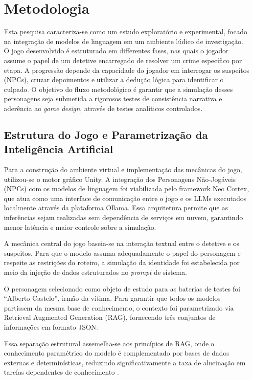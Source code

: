 \documentclass[12pt]{article}
\begin{document}
\section{Metodologia}

Esta pesquisa caracteriza-se como um estudo exploratório e experimental, focado na integração de modelos de linguagem em um ambiente lúdico de investigação. O jogo desenvolvido é estruturado em differentes fases, nas quais o jogador assume o papel de um detetive encarregado de resolver um crime específico por etapa. A progressão depende da capacidade do jogador em interrogar os suspeitos (NPCs), cruzar depoimentos e utilizar a dedução lógica para identificar o culpado. O objetivo do fluxo metodológico é garantir que a simulação desses personagens seja submetida a rigorosos testes de consistência narrativa e aderência ao \textit{game design}, através de testes analíticos controlados.

\subsection{Estrutura do Jogo e Parametrização da Inteligência Artificial}

Para a construção do ambiente virtual e implementação das mecânicas do jogo, utilizou-se o motor gráfico Unity. A integração dos Personagens Não-Jogáveis (NPCs) com os modelos de linguagem foi viabilizada pelo framework Neo Cortex, que atua como uma interface de comunicação entre o jogo e os LLMs executados localmente através da plataforma Ollama. Essa arquitetura permite que as inferências sejam realizadas sem dependência de serviços em nuvem, garantindo menor latência e maior controle sobre a simulação.

A mecânica central do jogo baseia-se na interação textual entre o detetive e os suspeitos. Para que o modelo assuma adequadamente o papel do personagem e respeite as restrições do roteiro, a simulação da identidade foi estabelecida por meio da injeção de dados estruturados no \textit{prompt} de sistema. 

O personagem selecionado como objeto de estudo para as baterias de testes foi ``Alberto Castelo'', irmão da vítima. Para garantir que todos os modelos partissem da mesma base de conhecimento, o contexto foi parametrizado via Retrieval Augmented Generation (RAG), fornecendo três conjuntos de informações em formato JSON:

Essa separação estrutural assemelha-se aos princípios de RAG, onde o conhecimento paramétrico do modelo é complementado por bases de dados externas e determinísticas, reduzindo significativamente a taxa de alucinação em tarefas dependentes de conhecimento \cite{lewis2020retrieval}.
\end{document}
